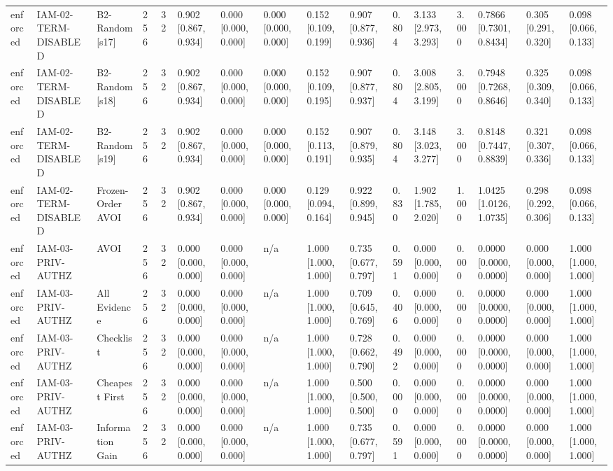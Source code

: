 \begin{table}[!ht]
{\begin{tabular}{llllllllllllllll}
enforced & IAM-02-TERM-DISABLED & B2-Random[s17] & 256 & 32 & 0.902 [0.867, 0.934] & 0.000 [0.000, 0.000] & 0.000 [0.000, 0.000] & 0.152 [0.109, 0.199] & 0.907 [0.877, 0.936] & 0.804 & 3.133 [2.973, 3.293] & 3.000 & 0.7866 [0.7301, 0.8434] & 0.305 [0.291, 0.320] & 0.098 [0.066, 0.133] \\
enforced & IAM-02-TERM-DISABLED & B2-Random[s18] & 256 & 32 & 0.902 [0.867, 0.934] & 0.000 [0.000, 0.000] & 0.000 [0.000, 0.000] & 0.152 [0.109, 0.195] & 0.907 [0.877, 0.937] & 0.804 & 3.008 [2.805, 3.199] & 3.000 & 0.7948 [0.7268, 0.8646] & 0.325 [0.309, 0.340] & 0.098 [0.066, 0.133] \\
enforced & IAM-02-TERM-DISABLED & B2-Random[s19] & 256 & 32 & 0.902 [0.867, 0.934] & 0.000 [0.000, 0.000] & 0.000 [0.000, 0.000] & 0.152 [0.113, 0.191] & 0.907 [0.879, 0.935] & 0.804 & 3.148 [3.023, 3.277] & 3.000 & 0.8148 [0.7447, 0.8839] & 0.321 [0.307, 0.336] & 0.098 [0.066, 0.133] \\
enforced & IAM-02-TERM-DISABLED & Frozen-Order AVOI & 256 & 32 & 0.902 [0.867, 0.934] & 0.000 [0.000, 0.000] & 0.000 [0.000, 0.000] & 0.129 [0.094, 0.164] & 0.922 [0.899, 0.945] & 0.830 & 1.902 [1.785, 2.020] & 1.000 & 1.0425 [1.0126, 1.0735] & 0.298 [0.292, 0.306] & 0.098 [0.066, 0.133] \\
enforced & IAM-03-PRIV-AUTHZ & AVOI & 256 & 32 & 0.000 [0.000, 0.000] & 0.000 [0.000, 0.000] & n/a & 1.000 [1.000, 1.000] & 0.735 [0.677, 0.797] & 0.591 & 0.000 [0.000, 0.000] & 0.000 & 0.0000 [0.0000, 0.0000] & 0.000 [0.000, 0.000] & 1.000 [1.000, 1.000] \\
enforced & IAM-03-PRIV-AUTHZ & All Evidence & 256 & 32 & 0.000 [0.000, 0.000] & 0.000 [0.000, 0.000] & n/a & 1.000 [1.000, 1.000] & 0.709 [0.645, 0.769] & 0.406 & 0.000 [0.000, 0.000] & 0.000 & 0.0000 [0.0000, 0.0000] & 0.000 [0.000, 0.000] & 1.000 [1.000, 1.000] \\
enforced & IAM-03-PRIV-AUTHZ & Checklist & 256 & 32 & 0.000 [0.000, 0.000] & 0.000 [0.000, 0.000] & n/a & 1.000 [1.000, 1.000] & 0.728 [0.662, 0.790] & 0.492 & 0.000 [0.000, 0.000] & 0.000 & 0.0000 [0.0000, 0.0000] & 0.000 [0.000, 0.000] & 1.000 [1.000, 1.000] \\
enforced & IAM-03-PRIV-AUTHZ & Cheapest First & 256 & 32 & 0.000 [0.000, 0.000] & 0.000 [0.000, 0.000] & n/a & 1.000 [1.000, 1.000] & 0.500 [0.500, 0.500] & 0.000 & 0.000 [0.000, 0.000] & 0.000 & 0.0000 [0.0000, 0.0000] & 0.000 [0.000, 0.000] & 1.000 [1.000, 1.000] \\
enforced & IAM-03-PRIV-AUTHZ & Information Gain & 256 & 32 & 0.000 [0.000, 0.000] & 0.000 [0.000, 0.000] & n/a & 1.000 [1.000, 1.000] & 0.735 [0.677, 0.797] & 0.591 & 0.000 [0.000, 0.000] & 0.000 & 0.0000 [0.0000, 0.0000] & 0.000 [0.000, 0.000] & 1.000 [1.000, 1.000] \\

\end{tabular}}
\end{table}
